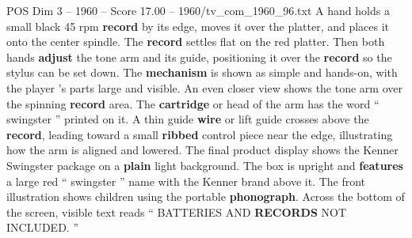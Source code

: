 \begin{textsample}{POS Dim 3 – 1960 – Score 17.00 – 1960/tv\_com\_1960\_96.txt}
A hand holds a small black 45 rpm \textbf{record} by its edge, moves it over the platter, and places it onto the center spindle.
The \textbf{record} settles flat on the red platter.
Then both hands \textbf{adjust} the tone arm and its guide, positioning it over the \textbf{record} so the stylus can be set down.
The \textbf{mechanism} is shown as simple and hands-on, with the player ’s parts large and visible.
An even closer view shows the tone arm over the spinning \textbf{record} area.
The \textbf{cartridge} or head of the arm has the word “ swingster ” printed on it.
A thin guide \textbf{wire} or lift guide crosses above the \textbf{record}, leading toward a small \textbf{ribbed} control piece near the edge, illustrating how the arm is aligned and lowered.
The final product display shows the Kenner Swingster package on a \textbf{plain} light background.
The box is upright and \textbf{features} a large red “ swingster ” name with the Kenner brand above it.
The front illustration shows children using the portable \textbf{phonograph}.
Across the bottom of the screen, visible text reads “ BATTERIES AND \textbf{RECORDS} NOT INCLUDED. ”

\end{textsample}
